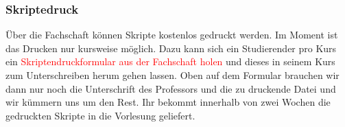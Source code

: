 \subsubsection{Skriptedruck}
Über die Fachschaft können Skripte kostenlos gedruckt werden. 
Im Moment ist das Drucken nur kursweise möglich. Dazu kann sich 
ein Studierender pro Kurs ein  \textcolor{red}{Skriptendruckformular aus der 
Fachschaft holen} und dieses in seinem Kurs zum Unterschreiben 
herum gehen lassen. Oben auf dem Formular brauchen wir dann nur 
noch die Unterschrift des Professors und die zu druckende Datei und 
wir kümmern uns um den Rest. Ihr bekommt innerhalb von zwei 
Wochen die gedruckten Skripte in die Vorlesung geliefert. 